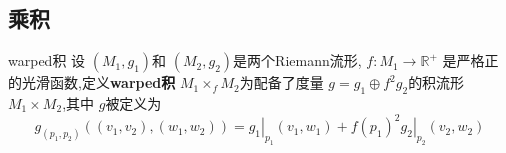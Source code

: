 \documentclass[../../几何与拓扑.tex]{subfiles}
\begin{document}
\subsection{乘积}

\begin{definition}{warped积}
    设 \(  \left( M_1,g_1 \right)   \)和 \(  \left( M_2,g_2 \right)   \)是两个Riemann流形,  \(  f: M_1\to \mathbb{R} ^{+ }  \) 是严格正的光滑函数,定义\textbf{warped积} \(  M_1\times _{f}M_2  \)为配备了度量 \(  g =  g_1\oplus f^{2}g_2  \)的积流形 \(  M_1\times M_2  \),其中 \(  g  \)被定义为 \[
    g_{\left( p_1,p_2 \right) }\left( \left( v_1,v_2 \right),\left( w_1,w_2 \right)   \right)= \left. g_1 \right|_{p_1}\left( v_1,w_1 \right)+ f\left( p_1 \right)^{2}\left. g_2 \right|_{p_2}\left( v_2,w_2 \right)    
    \]    
\end{definition}
\end{document}

